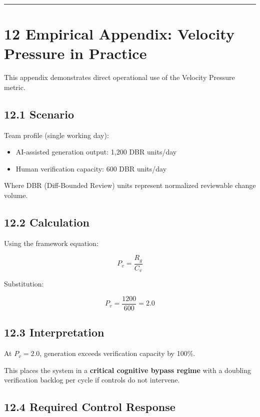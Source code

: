 \documentclass[
]{article}
\providecommand{\tightlist}{%
  \setlength{\itemsep}{0pt}\setlength{\parskip}{0pt}}
\begin{document}
\begin{center}\rule{0.5\linewidth}{0.5pt}\end{center}

\section{12 Empirical Appendix: Velocity Pressure in
Practice}\label{12-empirical-appendix-velocity-pressure-in-practice}

This appendix demonstrates direct operational use of the Velocity
Pressure metric.

\subsection{12.1 Scenario}\label{121-scenario}

Team profile (single working day):

\begin{itemize}
\tightlist
\item
  AI-assisted generation output: 1,200 DBR units/day
\item
  Human verification capacity: 600 DBR units/day
\end{itemize}

Where DBR (Diff-Bounded Review) units represent normalized reviewable
change volume.

\subsection{12.2 Calculation}\label{122-calculation}

Using the framework equation:

\[
P_v = \frac{R_g}{C_v}
\]

Substitution:

\[
P_v = \frac{1200}{600} = 2.0
\]

\subsection{12.3 Interpretation}\label{123-interpretation}

At \(P_v = 2.0\), generation exceeds verification capacity by 100\%.

This places the system in a \textbf{critical cognitive bypass regime}
with a doubling verification backlog per cycle if controls do not
intervene.

\subsection{12.4 Required Control
Response}\label{124-required-control-response}
\end{document}
